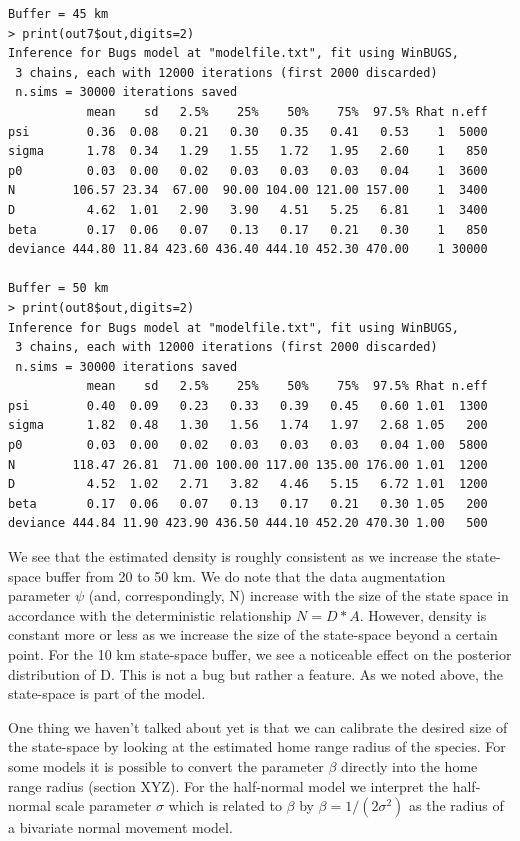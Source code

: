 \begin{verbatim}
Buffer = 45 km
> print(out7$out,digits=2)
Inference for Bugs model at "modelfile.txt", fit using WinBUGS,
 3 chains, each with 12000 iterations (first 2000 discarded)
 n.sims = 30000 iterations saved
           mean    sd   2.5%    25%    50%    75%  97.5% Rhat n.eff
psi        0.36  0.08   0.21   0.30   0.35   0.41   0.53    1  5000
sigma      1.78  0.34   1.29   1.55   1.72   1.95   2.60    1   850
p0         0.03  0.00   0.02   0.03   0.03   0.03   0.04    1  3600
N        106.57 23.34  67.00  90.00 104.00 121.00 157.00    1  3400
D          4.62  1.01   2.90   3.90   4.51   5.25   6.81    1  3400
beta       0.17  0.06   0.07   0.13   0.17   0.21   0.30    1   850
deviance 444.80 11.84 423.60 436.40 444.10 452.30 470.00    1 30000

Buffer = 50 km
> print(out8$out,digits=2)
Inference for Bugs model at "modelfile.txt", fit using WinBUGS,
 3 chains, each with 12000 iterations (first 2000 discarded)
 n.sims = 30000 iterations saved
           mean    sd   2.5%    25%    50%    75%  97.5% Rhat n.eff
psi        0.40  0.09   0.23   0.33   0.39   0.45   0.60 1.01  1300
sigma      1.82  0.48   1.30   1.56   1.74   1.97   2.68 1.05   200
p0         0.03  0.00   0.02   0.03   0.03   0.03   0.04 1.00  5800
N        118.47 26.81  71.00 100.00 117.00 135.00 176.00 1.01  1200
D          4.52  1.02   2.71   3.82   4.46   5.15   6.72 1.01  1200
beta       0.17  0.06   0.07   0.13   0.17   0.21   0.30 1.05   200
deviance 444.84 11.90 423.90 436.50 444.10 452.20 470.30 1.00   500
\end{verbatim}

We see that the estimated density is roughly consistent as we increase the state-space buffer from 20 to 50 km. We do note that the data augmentation parameter $\psi$  (and, correspondingly, N) increase with the size of the state space in accordance with the deterministic relationship $N= D*A$. However, density is constant more or less as we increase the size of the state-space beyond a certain point.  
For the 10 km state-space buffer, we see a noticeable effect on the posterior distribution of D. This is not a bug but rather a feature. As we noted above, the state-space is part of the model. 

One thing we haven't talked about yet is that we can calibrate the desired size of the state-space by looking at the estimated home range radius of the species. For some models it is possible to convert the parameter $\beta$ directly into the home range radius (section XYZ). For the half-normal model we interpret the half-normal scale parameter $\sigma$ which is related to $\beta$ by $\beta = 1/(2\sigma^2)$ as the radius of a bivariate normal movement model. 

